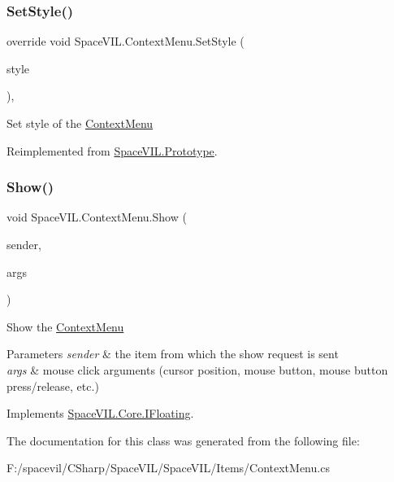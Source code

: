 \subsubsection{\texorpdfstring{Set\+Style()}{SetStyle()}}
{\footnotesize\ttfamily override void Space\+V\+I\+L.\+Context\+Menu.\+Set\+Style (\begin{DoxyParamCaption}\item[{\mbox{\hyperlink{class_space_v_i_l_1_1_decorations_1_1_style}{Style}}}]{style }\end{DoxyParamCaption})\hspace{0.3cm}{\ttfamily [inline]}, {\ttfamily [virtual]}}



Set style of the \mbox{\hyperlink{class_space_v_i_l_1_1_context_menu}{Context\+Menu}} 



Reimplemented from \mbox{\hyperlink{class_space_v_i_l_1_1_prototype_ae96644a6ace490afb376fb542161e541}{Space\+V\+I\+L.\+Prototype}}.

\mbox{\label{class_space_v_i_l_1_1_context_menu_a732b019d164e73d1fb165a2e1c065a50}} 
\subsubsection{\texorpdfstring{Show()}{Show()}}
{\footnotesize\ttfamily void Space\+V\+I\+L.\+Context\+Menu.\+Show (\begin{DoxyParamCaption}\item[{\mbox{\hyperlink{interface_space_v_i_l_1_1_core_1_1_i_item}{I\+Item}}}]{sender,  }\item[{\mbox{\hyperlink{class_space_v_i_l_1_1_core_1_1_mouse_args}{Mouse\+Args}}}]{args }\end{DoxyParamCaption})\hspace{0.3cm}{\ttfamily [inline]}}



Show the \mbox{\hyperlink{class_space_v_i_l_1_1_context_menu}{Context\+Menu}} 


\begin{DoxyParams}{Parameters}
{\em sender} & the item from which the show request is sent \\
\hline
{\em args} & mouse click arguments (cursor position, mouse button, mouse button press/release, etc.) \\
\hline
\end{DoxyParams}


Implements \mbox{\hyperlink{interface_space_v_i_l_1_1_core_1_1_i_floating}{Space\+V\+I\+L.\+Core.\+I\+Floating}}.



The documentation for this class was generated from the following file\+:\begin{DoxyCompactItemize}
\item 
F\+:/spacevil/\+C\+Sharp/\+Space\+V\+I\+L/\+Space\+V\+I\+L/\+Items/Context\+Menu.\+cs\end{DoxyCompactItemize}
